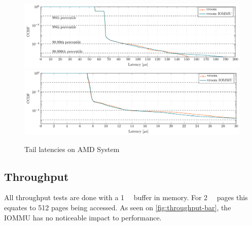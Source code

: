 \begin{figure}[H]
  \centering
   {\includegraphics[width=.99\textwidth]{figures/lats_ccdf_2MiB_qd1t1_read_epyc} \label{fig:ccdf-read-epyc}}
   {\includegraphics[width=.99\textwidth]{figures/lats_ccdf_2MiB_qd1t1_epyc} \label{fig:ccdf-write-epyc}}
  \caption{Tail latencies on AMD System}
  \label{fig:ccdf-epyc}
\end{figure}

\subsection{Throughput}
All throughput tests are done with a \qty{1}{\gibi\byte} buffer in memory. For \qty{2}{\mebi\byte} pages this equates to 512 pages being accessed. As seen on \autoref{fig:throughput-bar}, the IOMMU has no noticeable impact to performance.

